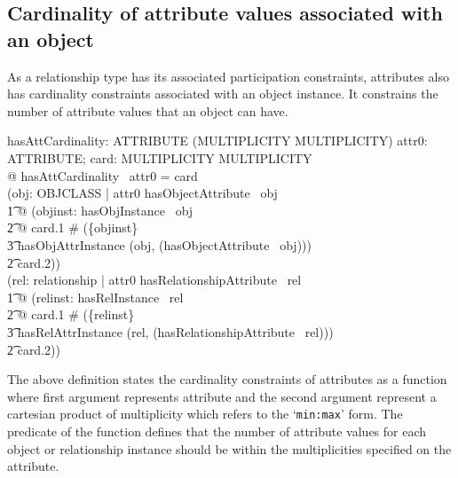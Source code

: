 \documentclass{entcs}
\begin{document}
\subsection{Cardinality of attribute values associated with an object}
As a relationship type has its associated participation
constraints, attributes also has cardinality constraints
associated with an object instance. It constrains the number of
attribute values that an object can have.
\begin{small}
\begin{axdef}
  hasAttCardinality: ATTRIBUTE \fun  (MULTIPLICITY \cross
  MULTIPLICITY)
\where
  \forall  attr0: ATTRIBUTE; card: MULTIPLICITY \cross  MULTIPLICITY \\
  @ hasAttCardinality~ attr0 = card \\
  \iff  (\forall  obj: OBJCLASS | attr0 \in  hasObjectAttribute~ obj \\
  \t1 @ (\forall  objinst: hasObjInstance~ obj \\
  \t2 @ card.1 \leq  \# (\{objinst\} \\
  \t3 \dres  hasObjAttrInstance (obj, (hasObjectAttribute~ obj))) \\
  \t2 \leq  card.2)) \\
  \lor  (\forall  rel: relationship | attr0 \in  hasRelationshipAttribute~ rel \\
  \t1 @ (\forall  relinst: hasRelInstance~ rel \\
  \t2 @ card.1 \leq  \# (\{relinst\} \\
  \t3 \dres  hasRelAttrInstance (rel, (hasRelationshipAttribute~ rel))) \\
  \t2 \leq  card.2))
\end{axdef}
\end{small}
The above definition states the cardinality constraints of
attributes as a function where first argument represents attribute
and the second argument represent a cartesian product of
multiplicity which refers to the `\texttt{min:max}' form. The
predicate of the function defines that the number of attribute
values for each object or relationship instance should be within
the multiplicities specified on the attribute.
%
%
\end{document}
